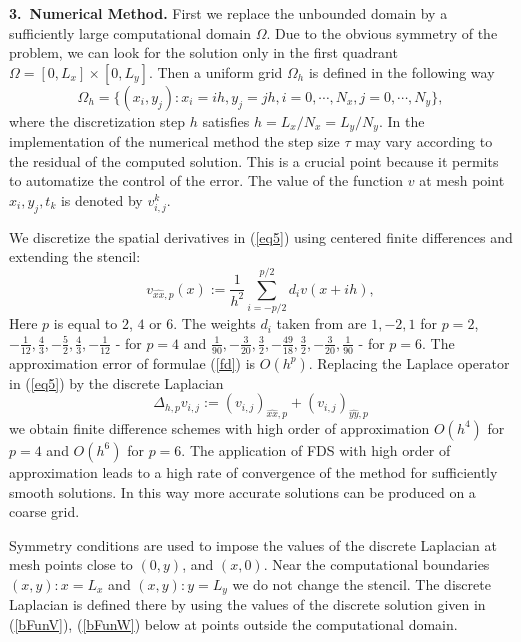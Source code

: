 \documentclass[leqno,11pt]{book}
\newcommand{\rf}[1]{(\ref{#1})}
\newcommand{\sect}[1]{\bigskip \par {\large\bf #1}}
\begin{document}
\bigskip

\sect{3.~Numerical Method.}
First we replace the unbounded domain by a sufficiently large computational domain $\Omega$. Due to the obvious symmetry of the problem, we can look for the solution only in the first quadrant $\Omega = [0,L_x] \times[0,L_y]$. Then a uniform grid $\Omega_h$ is defined in the following way
$$
\Omega_h = \{(x_i,y_j): x_i = ih, y_j = jh, i = 0,\cdots ,N_x, j = 0,\cdots , N_y \},
$$
where the discretization step $h$ satisfies
$ h = L_x/N_x = L_y/N_y$. 
 In the  implementation of the numerical method
the  step size $\tau$ may vary according to the residual of the computed solution. This is a crucial point because it permits  to automatize the control of the error.
The value of the function $v$ at mesh point $x_i,y_j,t_k$ is denoted by $v_{i,j}^k$.

We discretize the spatial  derivatives in \rf{eq5} using centered finite differences  
and extending the stencil:
\begin{equation}\label{fd}
v_{\widehat{xx},p}(x) :=  \frac{1}{h^2} \sum\limits_{i=-p/2}^{p/2} d_i v(x+ih),
\end{equation}
 Here $p$ is equal to $2$, $4$ or $6$.  The weights $d_i$ taken from  \cite{forn} are  
 $ 1,-2,1$ for $p=2$, $-\frac{1}{12}, \frac{4}{3}, -\frac{5}{2}, \frac{4}{3}, -\frac{1}{12}$ - for $p=4$ and  $\frac{1}{90}, -\frac{3}{20}, \frac{3}{2}, -\frac{49}{18}, \frac{3}{2}, -\frac{3}{20}, \frac{1}{90}$ - for $p=6$. The approximation error of  formulae \rf{fd} is $O(h^p)$. Replacing the Laplace operator in \rf{eq5} by the discrete Laplacian $$ \Delta_{h,p} v_{i,j} := (v_{i,j})_{\widehat{xx},p} + (v_{i,j})_{\widehat{yy},p}$$ we obtain finite difference schemes with high order of approximation $O(h^4)$ for $p=4$ and  $O(h^6)$ for $p=6 $.  The application of FDS with high order of approximation leads to a high rate of convergence of the method for   sufficiently smooth solutions.
In this way more accurate solutions can be produced on a coarse grid.

Symmetry conditions are used to impose the values of the discrete Laplacian at mesh points close to ${(0,y)}$, and $(x,0)$. 
Near  the computational boundaries $(x,y):x=L_x$ and $(x,y):y=L_y$ we do not change the stencil. The discrete Laplacian
is defined  there by using the values of the discrete solution given in \rf{bFunV}, \rf{bFunW} below at  points outside the computational domain.
\end{document}
